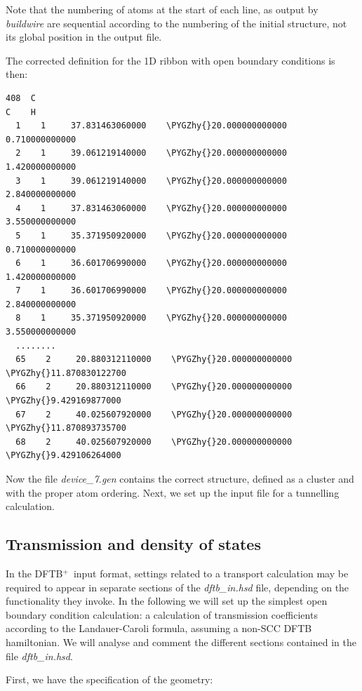 \documentclass[a4paper,11pt,english]{sphinxmanual}
\newcommand{\dftbp}{\textsf{DFTB$^{\text{+}}$\ }} %
\def\PYGZhy{\char`\-}
\begin{document}
{{Note that the numbering of atoms at the start of each line, as output
by \emph{buildwire} are sequential according to the numbering of the
initial structure, not its global position in the output file.

The corrected definition for the 1D ribbon with open boundary
conditions is then:

\begin{Verbatim}[commandchars=\\\{\}]
408  C
C    H
  1    1     37.831463060000    \PYGZhy{}20.000000000000      0.710000000000
  2    1     39.061219140000    \PYGZhy{}20.000000000000      1.420000000000
  3    1     39.061219140000    \PYGZhy{}20.000000000000      2.840000000000
  4    1     37.831463060000    \PYGZhy{}20.000000000000      3.550000000000
  5    1     35.371950920000    \PYGZhy{}20.000000000000      0.710000000000
  6    1     36.601706990000    \PYGZhy{}20.000000000000      1.420000000000
  7    1     36.601706990000    \PYGZhy{}20.000000000000      2.840000000000
  8    1     35.371950920000    \PYGZhy{}20.000000000000      3.550000000000
  ........
  65    2     20.880312110000    \PYGZhy{}20.000000000000    \PYGZhy{}11.870830122700
  66    2     20.880312110000    \PYGZhy{}20.000000000000     \PYGZhy{}9.429169877000
  67    2     40.025607920000    \PYGZhy{}20.000000000000    \PYGZhy{}11.870893735700
  68    2     40.025607920000    \PYGZhy{}20.000000000000     \PYGZhy{}9.429106264000
\end{Verbatim}

Now the file \emph{device\_7.gen} contains the correct structure, defined as
a cluster and with the proper atom ordering. Next, we set up the input
file for a tunnelling calculation.


\subsection{Transmission and density of states}
\label{transport:transmission-and-density-of-states}
In the \dftbp input format, settings related to a transport
calculation may be required to appear in separate sections of the
\emph{dftb\_in.hsd} file, depending on the functionality they invoke. In the
following we will set up the simplest open boundary condition
calculation: a calculation of transmission coefficients according to
the Landauer-Caroli formula, assuming a non-SCC DFTB hamiltonian. We
will analyse and comment the different sections contained in the file
\emph{dftb\_in.hsd}.

First, we have the specification of the geometry:

}}
\end{document}

